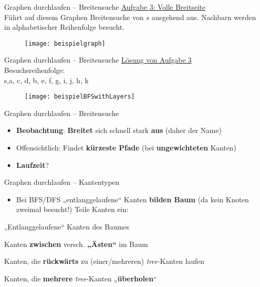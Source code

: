 \begin{frame}{Graphen durchlaufen – Breitensuche}
	\underline{Aufgabe 3: Volle Breitseite} \\
	Führt auf diesem Graphen Breitensuche von $s$ ausgehend aus. Nachbarn werden in alphabetischer Reihenfolge besucht.
	\begin{figure}[htp]
		\centering
		\texttt{[image: beispielgraph]}
	\end{figure}
\end{frame}

\begin{frame}{Graphen durchlaufen – Breitensuche}
	\underline{Lösung von Aufgabe 3} \\
	Besuchsreihenfolge: \\ s,\quad a, c, d, \quad b, e, f, g, i, j, \quad h, k
	\begin{figure}[htp]
		\centering
		\texttt{[image: beispielBFSwithLayers]}
	\end{figure}
\end{frame}

\begin{frame}{Graphen durchlaufen – Breitensuche}
	\begin{itemize}
		\item<+-> \textbf{Beobachtung}: \textbf{Breitet} sich schnell stark \textbf{aus} (daher der Name)
		\item<+-> Offensichtlich: Findet \textbf{kürzeste Pfade} (bei \textbf{ungewichteten} Kanten)
		\item<+-> \textbf{Laufzeit}? \visible<+->{$\Theta(n+m)$} \\ 
	\end{itemize}
\end{frame}

\begin{frame}{Graphen durchlaufen – Kantentypen}
	\begin{itemize}
		\item Bei BFS/DFS „entlanggelaufene“ Kanten \textbf{bilden Baum} {\small (da kein Knoten zweimal besucht!)}
		\pause
		\implitem Teile Kanten ein:
	\end{itemize}
	\vspace{-\baselineskip}
	{\small \begin{description} 
			\setlength\itemsep{0pt} %
			\setlength\topsep{0pt} 
			\setlength\parskip{0pt}
		\item[\textbf{tree}-:] „Entlanggelaufene“ Kanten des Baumes
		\pause
		\item[\textbf{cross}-:] Kanten \textbf{zwischen} versch. \textbf{„Ästen“} im Baum
		\pause
		\item[\textbf{backward}-:] Kanten, die \textbf{rückwärts} zu (einer/mehreren) \emph{tree}-Kanten laufen
		\pause
		\item[\textbf{forward}-:] Kanten, die \textbf{mehrere} \emph{tree}-Kanten „\textbf{überholen}“
	\end{description}}
	\vspace{-.5\baselineskip}
	\centering
\end{frame}

